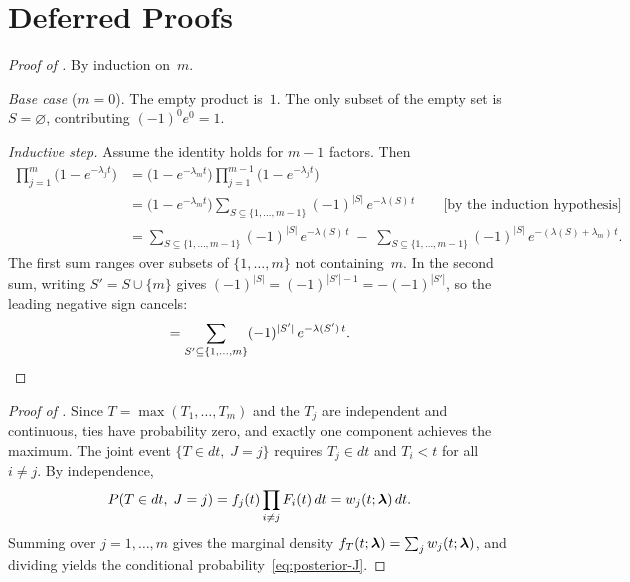 \appendix
\section{Deferred Proofs}
\label{sec:appendix-proofs}

\begin{proof}[Proof of ]
By induction on~$m$.

\emph{Base case} ($m = 0$).  The empty product is~$1$.  The only subset of
the empty set is $S = \varnothing$, contributing $(-1)^0 e^0 = 1$.

\emph{Inductive step.}  Assume the identity holds for $m-1$ factors.
Then
\begin{align*}
  \prod_{j=1}^m \bigl(1 - e^{-\lambda_j t}\bigr)
  &= \bigl(1 - e^{-\lambda_m t}\bigr)
     \prod_{j=1}^{m-1} \bigl(1 - e^{-\lambda_j t}\bigr) \\
  &= \bigl(1 - e^{-\lambda_m t}\bigr)
     \sum_{S \subseteq \{1,\ldots,m-1\}} (-1)^{|S|}\, e^{-\lambda(S)\, t}
     \qquad\text{[by the induction hypothesis]} \\
  &= \sum_{S \subseteq \{1,\ldots,m-1\}} (-1)^{|S|}\, e^{-\lambda(S)\, t}
     \;-\; \sum_{S \subseteq \{1,\ldots,m-1\}} (-1)^{|S|}\,
            e^{-(\lambda(S) + \lambda_m)\, t}.
\end{align*}
The first sum ranges over subsets of $\{1,\ldots,m\}$ not containing~$m$.
In the second sum, writing $S' = S \cup \{m\}$ gives
$(-1)^{|S|} = (-1)^{|S'|-1} = -(-1)^{|S'|}$, so the leading negative
sign cancels:
\[
  = \sum_{S' \subseteq \{1,\ldots,m\}} (-1)^{|S'|}\, e^{-\lambda(S')\, t}.
  \qedhere
\]
\end{proof}

\begin{proof}[Proof of ]
Since $T = \max(T_1, \ldots, T_m)$ and the $T_j$ are independent and
continuous, ties have probability zero, and exactly one component achieves
the maximum.  The joint event $\{T \in dt,\; J = j\}$ requires
$T_j \in dt$ and $T_i < t$ for all $i \neq j$.  By independence,
\[
  P(T \in dt,\; J = j) = f_j(t) \prod_{i \neq j} F_i(t)\, dt
  = w_j(t; \boldsymbol{\lambda})\, dt.
\]
Summing over $j = 1, \ldots, m$ gives the marginal density
$f_T(t; \boldsymbol{\lambda}) = \sum_j w_j(t; \boldsymbol{\lambda})$, and dividing yields the
conditional probability~\eqref{eq:posterior-J}.
\end{proof}
